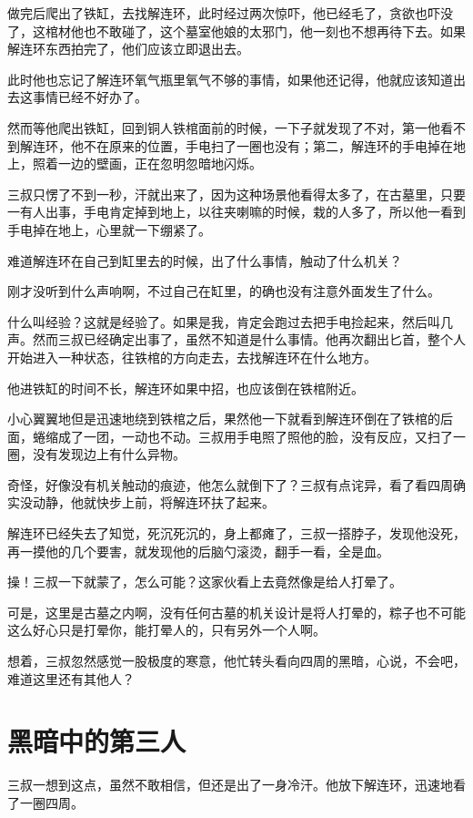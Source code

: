 做完后爬出了铁缸，去找解连环，此时经过两次惊吓，他已经毛了，贪欲也吓没了，这棺材他也不敢碰了，这个墓室他娘的太邪门，他一刻也不想再待下去。如果解连环东西拍完了，他们应该立即退出去。

此时他也忘记了解连环氧气瓶里氧气不够的事情，如果他还记得，他就应该知道出去这事情已经不好办了。

然而等他爬出铁缸，回到铜人铁棺面前的时候，一下子就发现了不对，第一他看不到解连环，他不在原来的位置，手电扫了一圈也没有；第二，解连环的手电掉在地上，照着一边的壁画，正在忽明忽暗地闪烁。

三叔只愣了不到一秒，汗就出来了，因为这种场景他看得太多了，在古墓里，只要一有人出事，手电肯定掉到地上，以往夹喇嘛的时候，栽的人多了，所以他一看到手电掉在地上，心里就一下绷紧了。

难道解连环在自己到缸里去的时候，出了什么事情，触动了什么机关？

刚才没听到什么声响啊，不过自己在缸里，的确也没有注意外面发生了什么。

什么叫经验？这就是经验了。如果是我，肯定会跑过去把手电捡起来，然后叫几声。然而三叔已经确定出事了，虽然不知道是什么事情。他再次翻出匕首，整个人开始进入一种状态，往铁棺的方向走去，去找解连环在什么地方。

他进铁缸的时间不长，解连环如果中招，也应该倒在铁棺附近。

小心翼翼地但是迅速地绕到铁棺之后，果然他一下就看到解连环倒在了铁棺的后面，蜷缩成了一团，一动也不动。三叔用手电照了照他的脸，没有反应，又扫了一圈，没有发现边上有什么异物。

奇怪，好像没有机关触动的痕迹，他怎么就倒下了？三叔有点诧异，看了看四周确实没动静，他就快步上前，将解连环扶了起来。

解连环已经失去了知觉，死沉死沉的，身上都瘫了，三叔一搭脖子，发现他没死，再一摸他的几个要害，就发现他的后脑勺滚烫，翻手一看，全是血。

操！三叔一下就蒙了，怎么可能？这家伙看上去竟然像是给人打晕了。

可是，这里是古墓之内啊，没有任何古墓的机关设计是将人打晕的，粽子也不可能这么好心只是打晕你，能打晕人的，只有另外一个人啊。

想着，三叔忽然感觉一股极度的寒意，他忙转头看向四周的黑暗，心说，不会吧，难道这里还有其他人？

\chapter{黑暗中的第三人}

三叔一想到这点，虽然不敢相信，但还是出了一身冷汗。他放下解连环，迅速地看了一圈四周。

